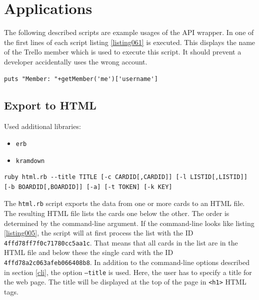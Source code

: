 \onehalfspacing
\chapter{Applications}\label{applications}

The following described scripts are example usages of the API wrapper. In one of the first lines of each script listing \ref{listing061} is executed. This displays the name of the Trello member which is used to execute this script. It should prevent a developer accidentally uses the wrong account.

\begin{lstlisting}[aboveskip=1\baselineskip, caption=Print the name of the actually used Trello member., label=listing061]
puts "Member: "+getMember('me')['username']
\end{lstlisting}

\section{Export to HTML}\label{html.rb}

Used additional libraries:
\begin{itemize}
	\item \texttt{erb}
	\item \texttt{kramdown}
\end{itemize}

\begin{lstlisting}[aboveskip=1\baselineskip, style=bash, caption=\texttt{html.rb} usage., label=listing026]
ruby html.rb --title TITLE [-c CARDID[,CARDID]] [-l LISTID[,LISTID]] [-b BOARDID[,BOARDID]] [-a] [-t TOKEN] [-k KEY]
\end{lstlisting}

The \texttt{html.rb} script exports the data from one or more cards to an HTML file. The resulting HTML file lists the cards one below the other. The order is determined by the command-line argument. If the command-line looks like listing \ref{listing005}, the script will at first process the list with the ID \texttt{4ffd78ff7f0c71780cc5aa1c}. That means that all cards in the list are in the HTML file and below these the single card with the ID \texttt{4ffd78a2c063afeb066408b8}. In addition to the command-line options described in section \ref{cli}, the option \texttt{--title} is used. Here, the user has to specify a title for the web page. The title will be displayed at the top of the page in \lstinline{<h1>} HTML tags.

